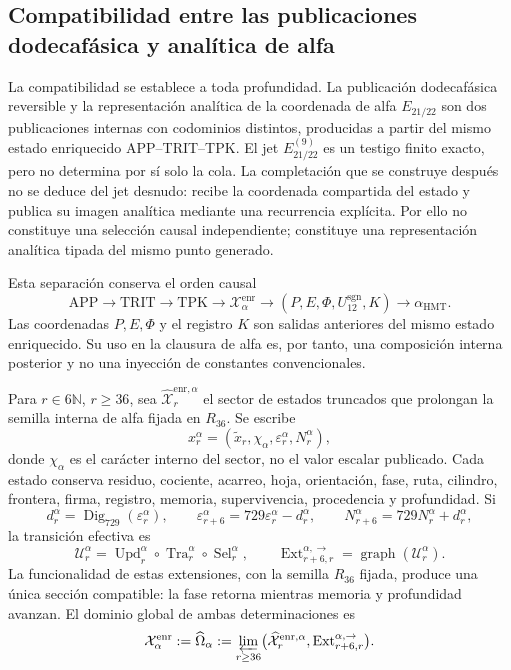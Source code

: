 \subsection{Compatibilidad entre las publicaciones dodecafásica y analítica de alfa}
\label{subsec:alpha-publicaciones-completas}

La compatibilidad se establece a toda profundidad. La publicación
dodecafásica reversible y la representación analítica de la
coordenada de alfa
\(E_{21/22}\) son dos publicaciones internas con codominios distintos,
producidas a partir del mismo estado enriquecido APP--TRIT--TPK. El jet
\(E_{21/22}^{(9)}\) es un testigo finito exacto, pero no determina por sí solo
la cola. La completación que se construye después no se deduce del jet
desnudo: recibe la coordenada compartida del estado y publica su imagen
analítica mediante una recurrencia explícita. Por ello no constituye una
selección causal independiente; constituye una representación analítica
tipada del mismo punto generado.

Esta separación conserva el orden causal
\[
 \mathrm{APP}\longrightarrow\mathrm{TRIT}\longrightarrow\mathrm{TPK}
 \longrightarrow\mathcal X_{\alpha}^{\mathrm{enr}}
 \longrightarrow (P,E,\Phi,U_{12}^{\mathrm{sgn}},K)
 \longrightarrow\alpha_{\mathrm{HMT}}.
\]
Las coordenadas \(P,E,\Phi\) y el registro \(K\) son salidas anteriores del
mismo estado enriquecido. Su uso en la clausura de alfa es, por tanto, una
composición interna posterior y no una inyección de constantes
convencionales.

Para \(r\in6\mathbb N\), \(r\ge36\), sea
\(\widehat{\mathcal X}^{\mathrm{enr},\alpha}_r\) el sector de estados
truncados que prolongan la semilla interna de alfa fijada en \(R_{36}\). Se
escribe
\[
 x_r^\alpha=(\widetilde x_r,\chi_\alpha,
              \varepsilon_r^\alpha,N_r^\alpha),
\]
donde \(\chi_\alpha\) es el carácter interno del sector, no el valor escalar
publicado. Cada estado conserva residuo, cociente, acarreo, hoja, orientación,
fase, ruta, cilindro, frontera, firma, registro, memoria, supervivencia,
procedencia y profundidad. Si
\[
 d_r^\alpha=\operatorname{Dig}_{729}(\varepsilon_r^\alpha),\qquad
 \varepsilon_{r+6}^\alpha=729\varepsilon_r^\alpha-d_r^\alpha,
 \qquad N_{r+6}^\alpha=729N_r^\alpha+d_r^\alpha,
\]
la transición efectiva es
\[
 \mathcal U_r^\alpha=
 \operatorname{Upd}_r^\alpha\circ
 \operatorname{Tra}_r^\alpha\circ
 \operatorname{Sel}_r^\alpha,
 \qquad
 \operatorname{Ext}^{\alpha,\to}_{r+6,r}
 =\operatorname{graph}(\mathcal U_r^\alpha).
\]
La funcionalidad de estas extensiones, con la semilla \(R_{36}\) fijada,
produce una única sección compatible: la fase retorna mientras memoria y
profundidad avanzan. El dominio global de ambas determinaciones es
\begin{equation}
 \mathcal X_\alpha^{\mathrm{enr}}:=\widehat\Omega_\alpha
 :=\varprojlim_{r\ge36}
 \bigl(\widehat{\mathcal X}^{\mathrm{enr},\alpha}_r,
       \operatorname{Ext}^{\alpha,\to}_{r+6,r}\bigr).
 \label{eq:alpha-dominio-enriquecido-completo}
\end{equation}

